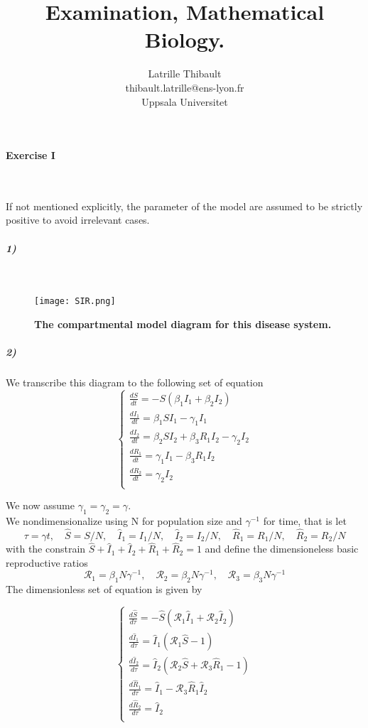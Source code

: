 \documentclass{article}
\author{Latrille Thibault\\
\small thibault.latrille@ens-lyon.fr\\[-0.8ex]
\small Uppsala Universitet\\}
\title{Examination, Mathematical Biology.}
\begin{document}
\maketitle
\renewcommand{\arraystretch}{1.5}
\paragraph{Exercise I}
\

If not mentioned explicitly, the parameter of the model are assumed to be strictly positive to avoid irrelevant cases.
\subparagraph{1)}
\

\begin{figure}[H]
	  \centering
  	\texttt{[image: SIR.png]}
  	\caption{\textbf{The compartmental model diagram for this disease system.}}
	\end{figure}

\subparagraph{2)} We transcribe this diagram to the following set of equation 
$$ \displaystyle \left \{
    \begin{array}{l}
        \frac{dS}{dt}=-S(\beta_1 I_1+\beta_2 I_2)\\
		\frac{dI_1}{dt}= \beta_1 S I_1 - \gamma_1 I_1 \\
		\frac{dI_2}{dt}= \beta_2 S I_2+\beta_3 R_1 I_2 - \gamma_2 I_2 \\
		\frac{dR_1}{dt}= \gamma_1 I_1-\beta_3 R_1 I_2 \\
		\frac{dR_2}{dt}= \gamma_2 I_2 \\
    \end{array}
\right. $$

We now assume  $\gamma_1=\gamma_2=\gamma$.\\

We nondimensionalize using N for population size and $\gamma^{-1}$ for time, that is let 
$$ \tau=\gamma t, \quad \widehat{S}=S/N, \quad \widehat{I}_1=I_1/N,\quad \widehat{I}_2=I_2/N, \quad \widehat{R}_1=R_1/N, \quad \widehat{R}_2=R_2/N $$
with the constrain $\widehat{S}+\widehat{I}_1+\widehat{I}_2+\widehat{R}_1+\widehat{R}_2=1$  and define the dimensioneless basic reproductive ratios
 $$\pmb{\mathcal{R}}_1=\beta_1 N\gamma^{-1}, \quad \pmb{\mathcal{R}}_2=\beta_2 N\gamma^{-1}, \quad  \pmb{\mathcal{R}}_3=\beta_3 N\gamma^{-1}$$
The dimensionless set of equation is given by

$$ \displaystyle \left \{
    \begin{array}{ll}
        \frac{d\widehat{S}}{d\tau}=-\widehat{S}(\pmb{\mathcal{R}}_1 \widehat{I}_1+ \pmb{\mathcal{R}}_2 \widehat{I}_2)\\
		\frac{d\widehat{I}_1}{d\tau}= \widehat{I}_1(\pmb{\mathcal{R}}_1 \widehat{S}-1) \\
		\frac{d\widehat{I}_2}{d\tau}= \widehat{I}_2(\pmb{\mathcal{R}}_2 \widehat{S} + \pmb{\mathcal{R}}_3 \widehat{R}_1 - 1) \\
		\frac{d\widehat{R}_1}{d\tau}= \widehat{I}_1-\pmb{\mathcal{R}}_3 \widehat{R}_1 \widehat{I}_2 \\
		\frac{d\widehat{R}_2}{d\tau}= \widehat{I}_2 \\
    \end{array}
\right. $$
\end{document}
